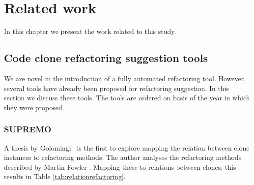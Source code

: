 \chapter{Related work} \label{ch:related_work}
In this chapter we present the work related to this study.

\section{Code clone refactoring suggestion tools}
We are novel in the introduction of a fully automated refactoring tool. However, several tools have already been proposed for refactoring suggestion. In this section we discuss these tools. The tools are ordered on basis of the year in which they were proposed.

\subsection{SUPREMO}
A thesis by Golomingi~\cite{koni2001scenario} is the first to explore mapping the relation between clone instances to refactoring methods. The author analyses the refactoring methods described by Martin Fowler \cite{fowler1999refactoring}. Mapping these to relations between clones, this results in Table \ref{tab:relationrefactoring}.

